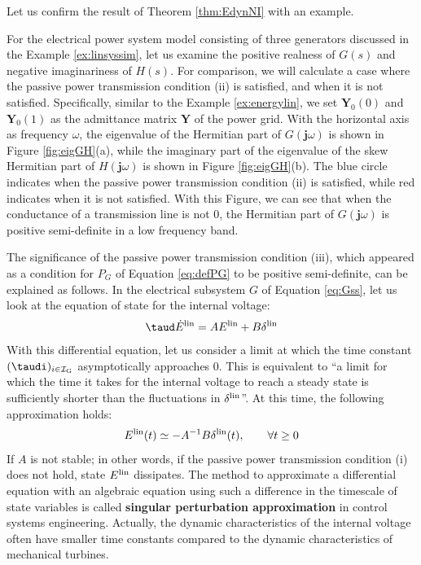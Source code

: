 \documentclass[graybox, envcountchap]{svmult}
\begin{document}
Let us confirm the result of Theorem \ref{thm:EdynNI} with an example.

\begin{example}
For the electrical power system model consisting of three generators discussed in the Example \ref{ex:linsyssim}, let us examine the positive realness of $G(s)$ and negative imaginariness of $H(s)$.
For comparison, we will calculate a case where the passive power transmission condition (ii) is satisfied, and when it is not satisfied.
Specifically, similar to the Example \ref{ex:energylin}, we set $\bm{Y}_0(0)$ and $\bm{Y}_0(1)$ as the admittance matrix $\bm{Y}$ of the power grid.
With the horizontal axis as frequency $\omega$, the eigenvalue of the Hermitian part of $G(\bm{j}\omega)$ is shown in Figure \ref{fig:eigGH}(a), while the imaginary part of the eigenvalue of the skew Hermitian part of $H(\bm{j}\omega)$ is shown in Figure \ref{fig:eigGH}(b).
The blue circle indicates when the passive power transmission condition (ii) is satisfied, while red indicates when it is not satisfied.
With this Figure, we can see that when the conductance of a transmission line is not 0, the Hermitian part of $G(\bm{j}\omega)$ is positive semi-definite in a low frequency band.
\end{example}

The significance of the passive power transmission condition (iii), which appeared as a condition for $P_G$ of Equation \ref{eq:defPG} to be positive semi-definite, can be explained as follows.
In the electrical subsystem $G$ of Equation \ref{eq:Gss}, let us look at the equation of state for the internal voltage: 
\begin{align*}
\taud
 \dot{E}^{\rm lin} = 
A E^{\rm lin} + B \delta^{\rm lin}
\end{align*}
With this differential equation, let us consider a limit at which the time constant $( \taudi )_{i \in \mathcal{I}_{\rm G}}$ asymptotically approaches 0.
This is equivalent to “a limit for which the time it takes for the internal voltage to reach a steady state is sufficiently shorter than the fluctuations in $\delta^{\rm lin}$”.
At this time, the following approximation holds:
\begin{align}\label{eq:spa}
E^{\rm lin}(t) \simeq  -A^{-1} B\delta^{\rm lin}(t)
,\qquad
\forall t\geq 0
\end{align}
If $A$ is not stable; in other words, if the passive power transmission condition (i) does not hold, state $E^{\rm lin}$ dissipates.
The method to approximate a differential equation with an algebraic equation using such a difference in the timescale of state variables is called \textbf{singular perturbation approximation} in control systems engineering.
Actually, the dynamic characteristics of the internal voltage often have smaller time constants compared to the dynamic characteristics of mechanical turbines.
\end{document}
